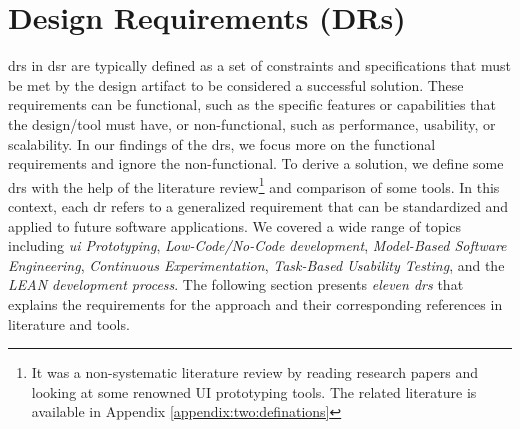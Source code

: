 \section{Design Requirements (DRs)}
\label{design:section:designReqs}
\ac{dr}s in \ac{dsr} are typically defined as a set of constraints and specifications that must be met by the design artifact to be considered a successful solution. 
These requirements can be functional, such as the specific features or capabilities that the design/tool must have, or non-functional, such as performance, usability, or scalability.
In our findings of the \ac{dr}s, we focus more on the functional requirements and ignore the non-functional.
To derive a solution, we define some \ac{dr}s with the help of the literature review\footnote{It was a non-systematic literature review by reading research papers and looking at some renowned UI prototyping tools. The related literature is available in Appendix \ref{appendix:two:definations}} and comparison of some tools.
In this context, each \ac{dr} refers to a generalized requirement that can be standardized and applied to future software applications.
We covered a wide range of topics including \textit{\ac{ui} Prototyping}, \textit{Low-Code/No-Code development}, \textit{Model-Based Software Engineering}, \textit{Continuous Experimentation}, \textit{Task-Based Usability Testing}, and the \textit{LEAN development process}.
The following section presents \textit{eleven \ac{dr}s} that explains the requirements for the approach and their corresponding references in literature and tools.
